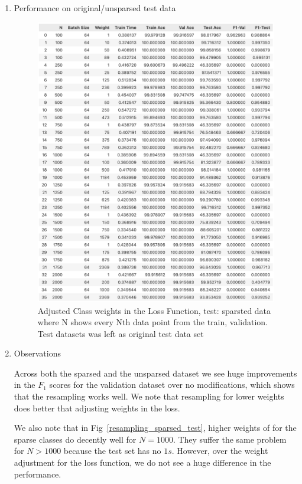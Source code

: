 \begin{solve}
\begin{enumerate}
    \item {Performance on original/unsparsed test data}
    \begin{figure}[H]
        \includegraphics[scale=.7]{plots/resampling_on_unsparsed_test}
        \caption{Adjusted Class weights in the  Loss Function, test: sparsted data where N shows every Nth data point from the train, validation. Test datasets was left as original test data set}
        \label{resampling_unsparsed_test}
    \end{figure}

    \item {Observations}
    
    Across both the sparsed and the unsparsed dataset we see huge improvements in the $F_1$ scores for the validation dataset over no modifications, which shows that the resampling works well. We note that resampling for lower weights does better that adjusting weights in the loss.

    We also note that in  Fig~\ref{resampling_sparsed_test}, higher weights of for the sparse classes do decently well for $N=1000$. They suffer the same problem for $N>1000$ because the test set has no $1s$. However, over the weight adjustment for the loss function, we do not see a huge difference in the performance.


\end{enumerate}
\end{solve}
